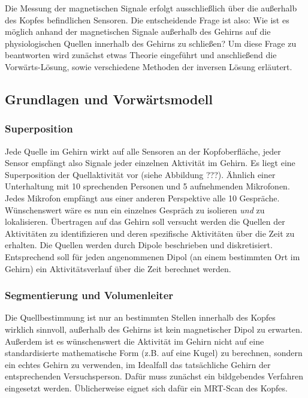 \documentclass[doc,a4paper,12pt]{apa6}
\begin{document}
Die Messung der magnetischen Signale erfolgt ausschließlich über die außerhalb des Kopfes befindlichen Sensoren. Die entscheidende Frage ist also: Wie ist es möglich anhand der magnetischen Signale außerhalb des Gehirns auf die physiologischen Quellen innerhalb des Gehirns zu schließen? Um diese Frage zu beantworten wird zunächst etwas Theorie eingeführt und anschließend die Vorwärts-Lösung, sowie verschiedene Methoden der inversen Lösung erläutert.


\subsection{Grundlagen und Vorwärtsmodell}

\subsubsection{Superposition}

Jede Quelle im Gehirn wirkt auf alle Sensoren an der Kopfoberfläche, jeder Sensor empfängt also Signale jeder einzelnen Aktivität im Gehirn. Es liegt eine Superposition der Quellaktivität vor (siehe Abbildung ???). Ähnlich einer Unterhaltung mit 10 sprechenden Personen und 5 aufnehmenden Mikrofonen. Jedes Mikrofon empfängt aus einer anderen Perspektive alle 10 Gespräche. Wünschenswert wäre es nun ein einzelnes Gespräch zu isolieren \emph{und} zu lokalisieren. Übertragen auf das Gehirn soll versucht werden die Quellen der Aktivitäten zu identifizieren und deren spezifische Aktivitäten über die Zeit zu erhalten. Die Quellen werden durch Dipole beschrieben und diskretisiert. Entsprechend soll für jeden angenommenen Dipol (an einem bestimmten Ort im Gehirn) ein Aktivitätsverlauf über die Zeit berechnet werden.

\subsubsection{Segmentierung und Volumenleiter}
\label{sec:segment}

Die Quellbestimmung ist nur an bestimmten Stellen innerhalb des Kopfes wirklich sinnvoll, außerhalb des Gehirns ist kein magnetischer Dipol zu erwarten. Außerdem ist es wünschenswert die Aktivität im Gehirn nicht auf eine standardisierte mathematische Form (z.B. auf eine Kugel) zu berechnen, sondern ein echtes Gehirn zu verwenden, im Idealfall das tatsächliche Gehirn der entsprechenden Versuchsperson. Dafür muss zunächst ein bildgebendes Verfahren eingesetzt werden. Üblicherweise eignet sich dafür ein MRT-Scan des Kopfes.
\end{document}
